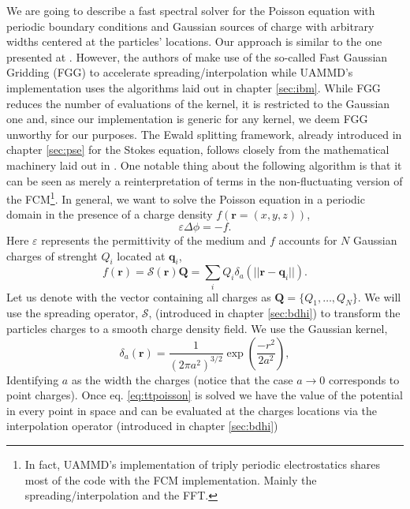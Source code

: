 \documentclass[ twoside,openright,titlepage,numbers=noenddot,%
headinclude,footinclude,cleardoublepage=empty,abstract=on,
BCOR=5mm,paper=a4,fontsize=11pt, dvipsnames
]{scrreprt}
\renewcommand{\vec}[1]{\bm{#1}}
\newcommand{\oper}[1]{\mathcal{#1}}
\newcommand{\ppos}{q}
\newcommand{\fpos}{r}
\begin{document}
We are going to describe a fast spectral solver for the Poisson equation with periodic boundary conditions and Gaussian sources of charge with arbitrary widths centered at the particles' locations. Our approach is similar to the one presented at \cite{Lindbo2011}. However, the authors of \cite{Lindbo2011} make use of the so-called Fast Gaussian Gridding (FGG) to accelerate spreading/interpolation while UAMMD's implementation uses the algorithms laid out in chapter \ref{sec:ibm}. While FGG reduces the number of evaluations of the kernel, it is restricted to the Gaussian one and, since our implementation is generic for any kernel, we deem FGG unworthy for our purposes. The Ewald splitting framework, already introduced in chapter \ref{sec:pse} for the Stokes equation, follows closely from the mathematical machinery laid out in \cite{Tornberg2015}.
One notable thing about the following algorithm is that it can be seen as merely a reinterpretation of terms in the non-fluctuating version of the \gls{FCM}\footnote{In fact, UAMMD's implementation of triply periodic electrostatics shares most of the code with the \gls{FCM} implementation. Mainly the spreading/interpolation and the \gls{FFT}.}.
In general, we want to solve the Poisson equation in a periodic domain in the presence of a charge density $f(\vec{\fpos}=(x,y,z))$,
\begin{equation}
  \label{eq:ttpoisson}
 \varepsilon\Delta\phi=-f.
\end{equation}
Here $\varepsilon$ represents the permittivity of the medium and $f$ accounts for $N$ Gaussian charges of strenght $Q_i$ located at $\vec{\ppos}_i$,
\begin{equation}
  \label{eq:tppoisson_cdens}
  f(\vec{\fpos})= \oper{S}(\vec{\fpos})\vec{Q} = \sum_iQ_i\delta_a(||\vec{\fpos}-\vec{\ppos}_i||).
\end{equation}
Let us denote with the vector containing all charges as $\vec{Q} = \{Q_1,\dots,Q_N\}$.
We will use the spreading operator, $\oper{S}$, (introduced in chapter \ref{sec:bdhi}) to transform the particles charges to a smooth charge density field. We use the Gaussian kernel,
\begin{equation}
  \label{eq:tpppoisson_gaussiansource}
  \delta_a(\vec{r})=\frac{1}{\left(2\pi a^2\right)^{3/2}}\exp{\left(\frac{-r^2}{2a^2}\right)},
\end{equation}
Identifying $a$ as the width the charges (notice that the case $a\rightarrow 0$ corresponds to point charges).
Once eq. \eqref{eq:ttpoisson} is solved we have the value of the potential in every point in space and can be evaluated at the charges locations via the interpolation operator (introduced in chapter \ref{sec:bdhi})
\end{document}
